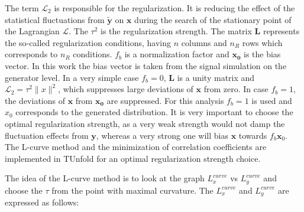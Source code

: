 
The term $\mathcal{L}_{2}$ is responsible for the regularization. It is reducing the effect of the statistical fluctuations from $\tilde{\mathbf{y}}$ on $\mathbf{x}$
during the search of the stationary point of the Lagrangian $\mathcal{L}$. The $\tau^{2}$ is the regularization strength. The matrix $\mathbf{L}$
represents the so-called regularization conditions, having $n$ columns and $n_{R}$ rows which corresponds to $n_{R}$ conditions. $f_{b}$ is a normalization 
factor and $\mathbf{x_{0}}$ is the bias vector. In this work the bias vector is taken from the signal simulation on the generator level. 
In a very simple case $f_{b} = 0$, $\mathbf{L}$ is a unity matrix and $\mathcal{L}_{2} = \tau^{2} \parallel x \parallel^{2}$, which
suppresses large deviations of $\mathbf{x}$ from zero. In case $f_{b} = 1$, the deviations of $\mathbf{x}$ from $\mathbf{x_{0}}$ are
suppressed. For this analysis $f_{b} = 1$ is used and $x_{0}$ corresponds to the generated distribution. It is very important to choose 
the optimal regularization strength, as a very weak strength would not damp the fluctuation effects from $\mathbf{y}$, whereas a very strong 
one will bias $\mathbf{x}$ towards $f_{b}\mathbf{x}_{0}$. The L-curve method \cite{Hansen00thel-curve} and the minimization
of correlation coefficients \cite{VBlobelT} are implemented in TUnfold for an optimal regularization strength choice. 

The idea of the L-curve method is to look at the graph $L_{x}^{curve}$ vs $L_{y}^{curve}$ and choose the $\tau$ from the point with
maximal curvature. The $L_{x}^{curve}$ and $L_{y}^{curve}$ are expressed as follows:

